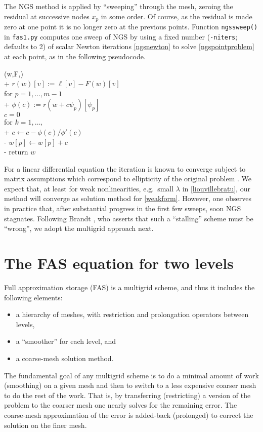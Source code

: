 \documentclass[letterpaper,final,12pt,reqno]{amsart}
\begin{document}
The NGS method is applied by ``sweeping'' through the mesh, zeroing the residual at successive nodes $x_p$ in some order.  Of course, as the residual is made zero at one point it is no longer zero at the previous points.  Function \texttt{ngssweep()} in \texttt{fas1.py} computes one sweep of NGS by using a fixed number (\texttt{-niters}; defaults to 2) of scalar Newton iterations \eqref{ngsnewton} to solve \eqref{ngspointproblem} at each point, as in the following pseudocode.


\begin{pseudo*}
(w,F,\ell)\text{:} \\+
    $r(w)[v] := \ell[v] - F(w)[v]$ \\
    for $p=1,\dots,m-1$ \\+
        $\phi(c) := r(w + c \psi_p)[\psi_p]$ \\
        $c=0$ \\
        for $k=1,\dots,$ \\+
            $c \gets c - \phi(c) / \phi'(c)$ \\-
        $w[p] \gets w[p] + c$ \\-
    return $w$
\end{pseudo*}

For a linear differential equation the iteration is known to converge subject to matrix assumptions which correspond to ellipticity of the original problem \cite[for example]{Greenbaum1997}.  We expect that, at least for weak nonlinearities, e.g.~small $\lambda$ in \eqref{liouvillebratu}, our method will converge as solution method for \eqref{weakform}.  However, one observes in practice that, after substantial progress in the first few sweeps, soon NGS stagnates.  Following Brandt \cite{Brandt1977}, who asserts that such a ``stalling'' scheme must be ``wrong'', we adopt the multigrid approach next.


\section{The FAS equation for two levels}

Full approximation storage (FAS) \cite{Brandt1977,Briggsetal2000} is a multigrid scheme, and thus it includes the following elements:
\begin{itemize}
\item a hierarchy of meshes, with restriction and prolongation operators between levels,
\item a ``smoother'' for each level, and
\item a coarse-mesh solution method.
\end{itemize}
The fundamental goal of any multigrid scheme is to do a minimal amount of work (smoothing) on a given mesh and then to switch to a less expensive coarser mesh to do the rest of the work.  That is, by transferring (restricting) a version of the problem to the coarser mesh one nearly solves for the remaining error.  The coarse-mesh approximation of the error is added-back (prolonged) to correct the solution on the finer mesh.
\end{document}
